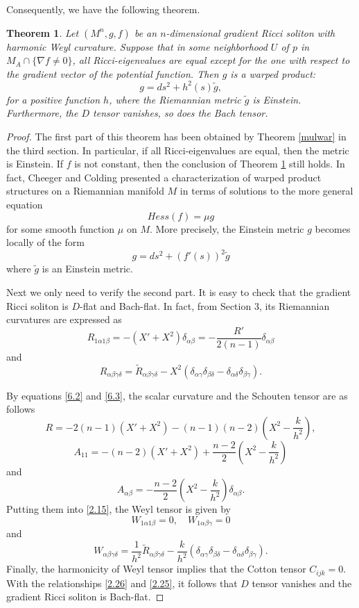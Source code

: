 \documentclass{amsart}
\newtheorem{theorem}{Theorem}[section]
\theoremstyle{definition}
\theoremstyle{remark}
\numberwithin{equation}{section}
\begin{document}
	Consequently, we have the following theorem.
	\begin{theorem} \label{same}
	Let $(M^n, g,f)$ be an $n$-dimensional gradient Ricci soliton 
	with harmonic Weyl curvature. 	
	Suppose  that in some neighborhood $U$ of $p$ in $M_A \cap \{ \nabla f \neq 0  \}$, 
    all Ricci-eigenvalues are equal except for the one with respect to the gradient vector of the potential function.
	Then $g$ is a warped product:
		\begin{equation} \label{metr}
		g= ds^2 +  h^2(s) \tilde{g},
		\end{equation}
		for a positive function $h$,
		where the Riemannian metric $\tilde{g}$ is Einstein. 
		Furthermore, the $D$ tensor vanishes, so does the Bach tensor. 
	\end{theorem}
	
	
	\begin{proof}
		The first part of this theorem has been obtained by Theorem \ref{mulwar} in the third section.
		In particular, if all Ricci-eigenvalues are equal, then the metric is Einstein. 
		If $f$ is not constant, then the conclusion of Theorem \ref{same} still holds.  
		In fact,  Cheeger and Colding \cite{CC} presented a
		characterization of warped product structures on a Riemannian manifold $M$ in terms
		of solutions to the more general equation
		\[
		Hess(f)=\mu g
		\]
		for some smooth function $\mu$ on $M$. 
		More precisely, the Einstein metric $g$ becomes locally of the form 
		\[
		g= ds^2 + (f'(s))^2 \tilde{g}
		\]
		where $\tilde{g}$ is an Einstein metric. 
		
		Next we only need to verify the second part.
		It is easy to check that the gradient Ricci soliton is $D$-flat and Bach-flat. 
		In fact, from Section 3, its Riemannian curvatures are expressed as
		\[
		R_{1\alpha 1\beta}=-\left( X'+X^2\right)\delta_{\alpha\beta}=-\frac{R'}{2(n-1)}\delta_{\alpha\beta}
		\]
		and 
		\[
		R_{\alpha\beta\gamma\delta}
		=\tilde {R}_{\alpha\beta\gamma\delta}-
		X^2\left( \delta_{\alpha\gamma}\delta_{\beta\delta}-\delta_{\alpha\delta}\delta_{\beta\gamma}\right).
		\]
		
		By equations \eqref{6.2} and \eqref{6.3}, the scalar curvature and the Schouten tensor are as follows
		\[
		R=-2(n-1)\left( X'+X^2\right)-(n-1)(n-2)\left(X^2-\frac{k}{h^2} \right),
		\]
		\[
		A_{11}=-(n-2)\left( X'+X^2\right)+\frac{n-2}{2}\left(X^2-\frac{k}{h^2} \right)
		\]
		and 
		\[
		A_{\alpha\beta}=-\frac{n-2}{2}\left(X^2-\frac{k}{h^2}\right)\delta_{\alpha\beta}.
		\]
		Putting them into \eqref{2.15}, the Weyl tensor is given by
		\[
		W_{1\alpha1\beta}=0, \quad W_{1\alpha\beta\gamma}=0
		\]
		and
		\[
		W_{\alpha\beta\gamma\delta}
		=\frac{1}{h^2}\tilde {R}_{\alpha\beta\gamma\delta}-
		\frac{k}{h^2}\left( \delta_{\alpha\gamma}\delta_{\beta\delta}-\delta_{\alpha\delta}\delta_{\beta\gamma}\right).
		\]
		Finally, the harmonicity of Weyl tensor implies that the Cotton tensor $C_{ijk}=0$.
		With the relationships \eqref{2.26} and \eqref{2.25},
		it follows that $D$ tensor vanishes and the gradient Ricci soliton is Bach-flat. 
	\end{proof}
	
\end{document}
